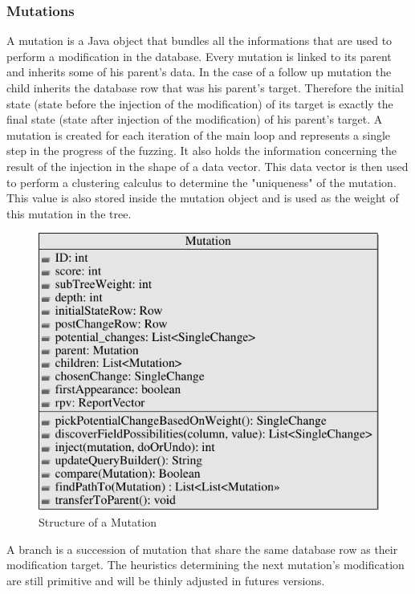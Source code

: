 \documentclass{article}
\begin{document}
\begin{empfile}
  				
			\subsubsection{Mutations}
A mutation is a Java object that bundles all the informations that are used to perform a modification in the database. Every mutation is linked to its parent and inherits some of his parent's data. In the case of a follow up mutation the child inherits the database row that was his parent's target. Therefore the initial state (state before the injection of the modification) of its target is exactly the final state (state after injection of the modification) of his parent's target. A mutation is created for each iteration of the main loop and represents a single step in the progress of the fuzzing.
It also holds the information concerning the result of the injection in the shape of a data vector. This data vector is then used to perform a clustering calculus to determine the "uniqueness" of the mutation. This value is also stored inside the mutation object and is used as the weight of this mutation in the tree.

\bigskip

\begin{figure} [h!]
\centering
\includegraphics[scale=0.9]{MutationClassDiagram-1.pdf}
\caption{Structure of a Mutation}
\end{figure}

\clearpage
				
A branch is a succession of mutation that share the same database row as their modification target.
The heuristics determining the next mutation's modification are still primitive and will be thinly adjusted in futures versions.								 

\end{empfile}
\end{document}
